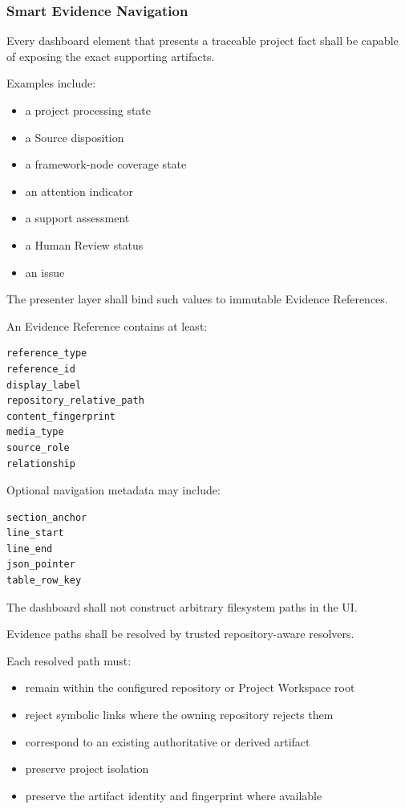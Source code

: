 \hypertarget{smart-evidence-navigation}{%
\subsubsection{Smart Evidence Navigation}\label{smart-evidence-navigation}}

Every dashboard element that presents a traceable project fact shall be capable of exposing the exact supporting artifacts.

Examples include:

\begin{itemize}
\tightlist
\item
  a project processing state
\item
  a Source disposition
\item
  a framework-node coverage state
\item
  an attention indicator
\item
  a support assessment
\item
  a Human Review status
\item
  an issue
\end{itemize}

The presenter layer shall bind such values to immutable Evidence References.

An Evidence Reference contains at least:

\begin{verbatim}
reference_type
reference_id
display_label
repository_relative_path
content_fingerprint
media_type
source_role
relationship
\end{verbatim}

Optional navigation metadata may include:

\begin{verbatim}
section_anchor
line_start
line_end
json_pointer
table_row_key
\end{verbatim}

The dashboard shall not construct arbitrary filesystem paths in the UI.

Evidence paths shall be resolved by trusted repository-aware resolvers.

Each resolved path must:

\begin{itemize}
\tightlist
\item
  remain within the configured repository or Project Workspace root
\item
  reject symbolic links where the owning repository rejects them
\item
  correspond to an existing authoritative or derived artifact
\item
  preserve project isolation
\item
  preserve the artifact identity and fingerprint where available
\end{itemize}

